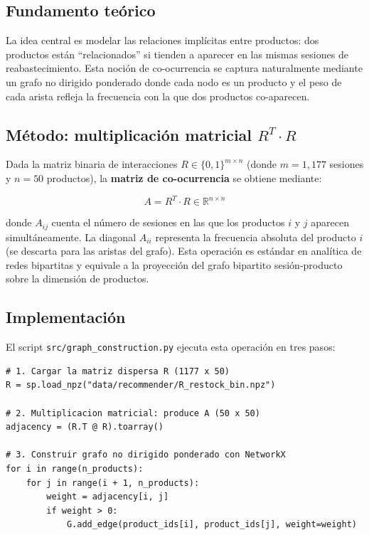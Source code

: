 \documentclass[12pt,a4paper]{article}
\newcommand{\code}[1]{\texttt{\small #1}}
\begin{document}
\subsection{Fundamento teórico}

La idea central es modelar las relaciones implícitas entre productos: dos productos están ``relacionados'' si tienden a aparecer en las mismas sesiones de reabastecimiento. Esta noción de co-ocurrencia se captura naturalmente mediante un grafo no dirigido ponderado donde cada nodo es un producto y el peso de cada arista refleja la frecuencia con la que dos productos co-aparecen.

\subsection{Método: multiplicación matricial $R^T \cdot R$}

Dada la matriz binaria de interacciones $R \in \{0,1\}^{m \times n}$ (donde $m = 1{,}177$ sesiones y $n = 50$ productos), la \textbf{matriz de co-ocurrencia} se obtiene mediante:

\begin{equation}
    A = R^T \cdot R \in \mathbb{R}^{n \times n}
\end{equation}

donde $A_{ij}$ cuenta el número de sesiones en las que los productos $i$ y $j$ aparecen simultáneamente. La diagonal $A_{ii}$ representa la frecuencia absoluta del producto $i$ (se descarta para las aristas del grafo). Esta operación es estándar en analítica de redes bipartitas y equivale a la proyección del grafo bipartito sesión-producto sobre la dimensión de productos.

\subsection{Implementación}

El script \code{src/graph\_construction.py} ejecuta esta operación en tres pasos:

\begin{lstlisting}[style=pystyle]
# 1. Cargar la matriz dispersa R (1177 x 50)
R = sp.load_npz("data/recommender/R_restock_bin.npz")

# 2. Multiplicacion matricial: produce A (50 x 50)
adjacency = (R.T @ R).toarray()

# 3. Construir grafo no dirigido ponderado con NetworkX
for i in range(n_products):
    for j in range(i + 1, n_products):
        weight = adjacency[i, j]
        if weight > 0:
            G.add_edge(product_ids[i], product_ids[j], weight=weight)
\end{lstlisting}
\end{document}
